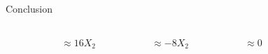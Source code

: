 \documentclass[11pt,compress,t,notes=noshow, aspectratio=169, xcolor=table,dvipsnames]{beamer}
\begin{document}
\begin{frame}{Conclusion}
\begin{columns}[T, totalwidth = \textwidth]
\begin{column}{0.45\textwidth}
\begin{columns}[T, totalwidth = \linewidth]
\begin{column}{0.175\linewidth}
         \end{column}
        \begin{column}{0.225\linewidth}
\centering
            $\approx 16X_2$ %
         \end{column}
        \begin{column}{0.225\linewidth}
        \centering
            $ \approx -8X_2$ %
         \end{column}        
         \begin{column}{0.225\linewidth}
         \centering
             $\approx 0$%
         \end{column}
        \begin{column}{0.025\linewidth}

         \end{column}
     \end{columns}
    \end{column}

\end{columns}
\bigskip
\end{frame}




\endlecture
\end{document}
